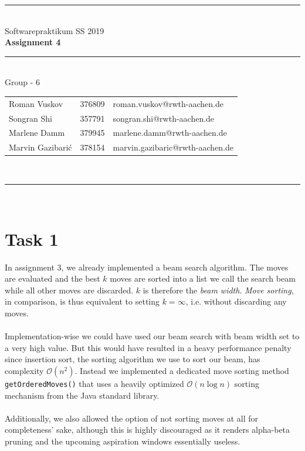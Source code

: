 \documentclass[a4paper,12pt]{article}
\begin{document}
\begin{center}
	\rule{\textwidth}{0.1pt}\\[1cm]
	
	\Large Softwarepraktikum SS 2019\\\bf Assignment 4
\end{center}


\begin{center}

	\rule{\textwidth}{0.1pt}\\[0.5cm]

	{\Large Group - 6\\[5mm]}

	\begin{tabular}{lll}

		Roman Vuskov & 376809 & roman.vuskov@rwth-aachen.de \\

		Songran Shi & 357791 & songran.shi@rwth-aachen.de \\

		Marlene Damm & 379945 & marlene.damm@rwth-aachen.de \\
		
		Marvin Gazibarić & 378154 & marvin.gazibaric@rwth-aachen.de \\

	\end{tabular}\\[0.5cm]

	\rule{\textwidth}{0.1pt}\\[1cm]

\end{center}

\newpage

\section{Task 1}

In assignment 3, we already implemented a beam search algorithm. The moves are evaluated and the best $k$ moves are sorted into a list we call the search beam while all other moves are discarded. $k$ is therefore the \emph{beam width}. \emph{Move sorting}, in comparison, is thus equivalent to setting $k=\infty$, i.e. without discarding any moves.
\\ \\
Implementation-wise we could have used our beam search with beam width set to a very high value. But this would have resulted in a heavy performance penalty since insertion sort, the sorting algorithm we use to sort our beam, has complexity $\mathcal O(n^2)$. Instead we implemented a dedicated move sorting method \texttt{getOrderedMoves()} that uses a heavily optimized $\mathcal O(n\log n)$ sorting mechanism from the Java standard library.
\\ \\
Additionally, we also allowed the option of not sorting moves at all for completeness' sake, although this is highly discouraged as it renders alpha-beta pruning and the upcoming aspiration windows essentially useless.
\end{document}

